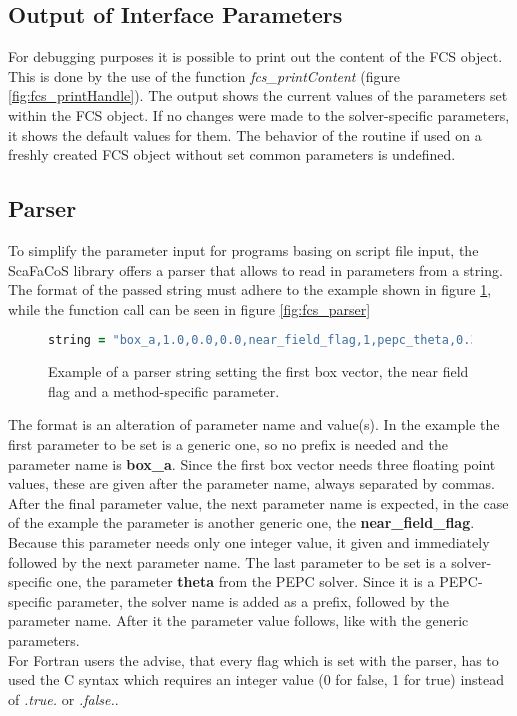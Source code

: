 \subsection{Output of Interface Parameters}

For debugging purposes it is possible to print out the content of the FCS object. This is done by the use of the function \textit{fcs\_printContent} (figure \ref{fig:fcs_printHandle}).
The output shows the current values of the parameters set within the FCS object. If no changes were made to the solver-specific parameters, it shows the default
values for them. The behavior of the routine if used on a freshly created FCS object without set common parameters is undefined.

\subsection{Parser}
\label{sec:interface_parser}

To simplify the parameter input for programs basing on script file input, the ScaFaCoS library offers a parser that allows to read in parameters from a string.
The format of the passed string must adhere to the example shown in figure \ref{fig:parser_example}, while the function call can be seen in figure \ref{fig:fcs_parser}

\begin{figure}[htb]
\begin{lstlisting}[language=Fortran,frame=trBL,breaklines,basicstyle=\small,prebreak={\raisebox{0ex}[0ex][0ex]{\ensuremath{\hookleftarrow}}}]
string = "box_a,1.0,0.0,0.0,near_field_flag,1,pepc_theta,0.3"
\end{lstlisting}
\caption{Example of a parser string setting the first box vector, the near field flag and a method-specific parameter.}
\label{fig:parser_example}
\end{figure}

The format is an alteration of parameter name and value(s). In the example the first parameter to be set is a generic one, so no prefix is needed and the parameter
name is \textbf{box\_a}. Since the first box vector needs three floating point values, these are given after the parameter name, always separated by commas.
After the final parameter value, the next parameter name is expected, in the case of the example the parameter is another generic one, the \textbf{near\_field\_flag}.
Because this parameter needs only one integer value, it given and immediately followed by the next parameter name. The last parameter to be set is a solver-specific
one, the parameter \textbf{theta} from the PEPC solver. Since it is a PEPC-specific parameter, the solver name is added as a prefix, followed by the parameter name.
After it the parameter value follows, like with the generic parameters.\\
For Fortran users the advise, that every flag which is set with the parser, has to used the C syntax which requires an integer value (0 for false, 1 for true) instead
of \textit{.true.} or \textit{.false.}.

\FloatBarrier
\renewcommand\arraystretch{1.0}
